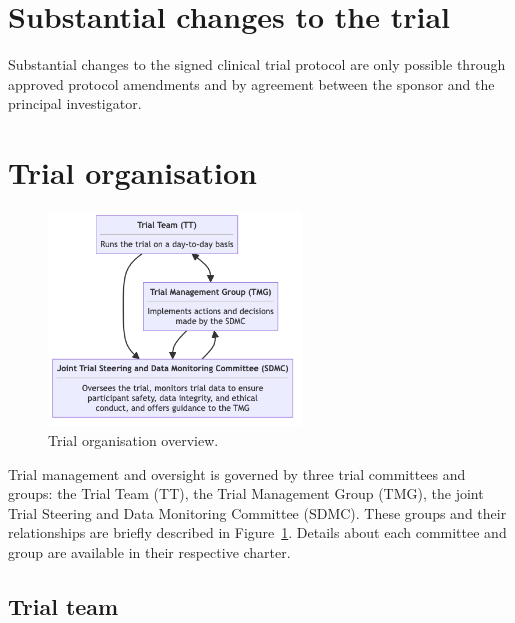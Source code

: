 \documentclass[
]{scrartcl}
\begin{document}
\hypertarget{substantial-changes-to-the-trial}{%
\section{Substantial changes to the
trial}\label{substantial-changes-to-the-trial}}

Substantial changes to the signed clinical trial protocol are only
possible through approved protocol amendments and by agreement between
the sponsor and the principal investigator.

\hypertarget{trial-organisation}{%
\section{Trial organisation}\label{trial-organisation}}

\begin{figure}

{\centering 

\includegraphics[width=0.6\textwidth,height=\textheight]{../shared-assets/trial-organisation-overview-figure.png}

}

\caption{\label{fig-organisation-overview}Trial organisation overview.}

\end{figure}

Trial management and oversight is governed by three trial committees and
groups: the Trial Team (TT), the Trial Management Group (TMG), the joint
Trial Steering and Data Monitoring Committee (SDMC). These groups and
their relationships are briefly described in
Figure~\ref{fig-organisation-overview}. Details about each committee and
group are available in their respective charter.

\hypertarget{trial-team}{%
\subsection{Trial team}\label{trial-team}}
\end{document}
